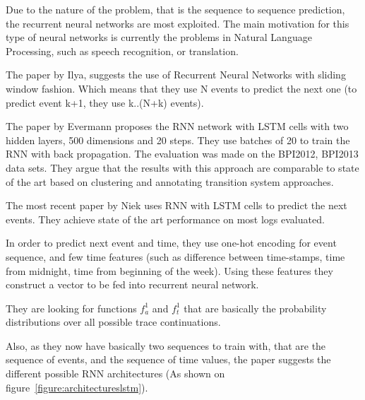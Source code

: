 Due to the nature of the problem, that is the sequence to sequence prediction, the recurrent neural networks are most exploited. The main motivation for this type of neural networks is currently the problems in Natural Language Processing, such as speech recognition\cite{graves2013icassp}, or translation\cite{Sutskever2014SSL29690332969173}. 

The paper by Ilya\cite{quteprints96732}, suggests the use of Recurrent Neural Networks with sliding window fashion. Which means that they use N events to predict the next one (to predict event k+1, they use k..(N+k) events). 

The paper by Evermann\cite{evermann} proposes the RNN network with LSTM cells with two hidden layers, 500 dimensions and 20 steps. They use batches of 20 to train the RNN with back propagation. The evaluation was made on the BPI2012, BPI2013 data sets. They argue that the results with this approach are comparable to state of the art based on clustering and annotating transition system approaches.

The most recent paper by Niek \cite{niek96732} uses RNN with LSTM cells to predict the next events. They achieve state of the art performance on most logs evaluated. 

In order to predict next event and time, they use one-hot encoding for event sequence, and few time features (such as difference between time-stamps, time from midnight, time from beginning of the week). Using these features they construct a vector to be fed into recurrent neural network. 

They are looking for functions $f_a^1$ and $f_t^1$ that are basically the probability distributions over all possible trace continuations.

Also, as they now have basically two sequences to train with, that are the sequence of events, and the sequence of time values, the paper suggests the different possible RNN architectures (As shown on figure~\ref{figure:architectureslstm}). 


